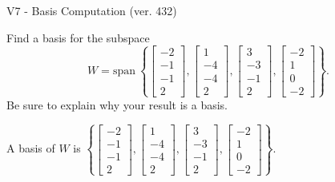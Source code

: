 \begin{exercise}
  \begin{exerciseTitle}V7 - Basis Computation (ver. 432)\end{exerciseTitle}
  \begin{exerciseStatement}
    Find a basis for the subspace 
\[W=\mathrm{span}\ \left\{\left[\begin{array}{r}
-2 \\
-1 \\
-1 \\
2
\end{array}\right] , \left[\begin{array}{r}
1 \\
-4 \\
-4 \\
2
\end{array}\right] , \left[\begin{array}{r}
3 \\
-3 \\
-1 \\
2
\end{array}\right] , \left[\begin{array}{r}
-2 \\
1 \\
0 \\
-2
\end{array}\right]\right\}.\]
 Be sure to explain why your result is a basis.


  \end{exerciseStatement}
  \begin{exerciseAnswer}
   A basis of \(W\) is  \(\left\{\left[\begin{array}{r}
-2 \\
-1 \\
-1 \\
2
\end{array}\right] , \left[\begin{array}{r}
1 \\
-4 \\
-4 \\
2
\end{array}\right] , \left[\begin{array}{r}
3 \\
-3 \\
-1 \\
2
\end{array}\right] , \left[\begin{array}{r}
-2 \\
1 \\
0 \\
-2
\end{array}\right]\right\}\).
  


  \end{exerciseAnswer}
\end{exercise}
